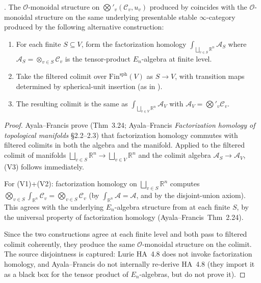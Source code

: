\begin{theorem}
\label{v4-arith:tate:thm:verification-via-factorization-homology}
\ClaimStatusProvedHere. The \(\mathcal{O}\)-monoidal structure on
\(\bigotimes'_{v}(\mathcal{C}_{v},u_{v})\) produced by
 coincides with the
\(\mathcal{O}\)-monoidal structure on the same underlying
presentable stable \(\infty\)-category produced by the following
alternative construction:
\begin{enumerate}
\item[(V1)] For each finite \(S\subseteq V\), form the factorization
homology
\(\int_{\bigsqcup_{v\in S}\mathbb{R}^{n}}\mathcal{A}_{S}\)
where \(\mathcal{A}_{S}=\otimes_{v\in S}\mathcal{C}_{v}\) is the
tensor-product \(E_{n}\)-algebra at finite level.
\item[(V2)] Take the filtered colimit over
\(\mathrm{Fin}^{\mathrm{sph}}(V)\) as \(S\to V\), with transition maps
determined by spherical-unit insertion (as in
).
\item[(V3)] The resulting colimit is the same as
\(\int_{\bigsqcup_{v\in V}\mathbb{R}^{n}}\mathcal{A}_{V}\) with
\(\mathcal{A}_{V}=\bigotimes'_{v}\mathcal{C}_{v}\).
\end{enumerate}
\end{theorem}

\begin{proof}
Ayala--Francis prove (Thm~3.24; Ayala--Francis
\emph{Factorization homology of topological manifolds}
\S2.2--2.3) that factorization homology commutes with filtered
colimits in both the algebra and the manifold. Applied to the
filtered colimit of manifolds \(\bigsqcup_{v\in S}\mathbb{R}^{n}\to\bigsqcup_{v\in V}\mathbb{R}^{n}\)
and the colimit algebra \(\mathcal{A}_{S}\to\mathcal{A}_{V}\),
(V3) follows immediately.

For (V1)+(V2): factorization homology on
\(\bigsqcup_{v\in S}\mathbb{R}^{n}\) computes
\(\bigotimes_{v\in S}\int_{\mathbb{R}^{n}}\mathcal{C}_{v}=\bigotimes_{v\in S}\mathcal{C}_{v}\)
(by \(\int_{\mathbb{R}^{n}}\mathcal{A}=\mathcal{A}\), and by the
disjoint-union axiom). This agrees with the underlying
\(E_{n}\)-algebra structure from 
at each finite \(S\), by the universal property of factorization
homology (Ayala--Francis~Thm~2.24).

Since the two constructions agree at each finite level and both
pass to filtered colimit coherently, they produce the same
\(\mathcal{O}\)-monoidal structure on the colimit. The source
disjointness is captured: Lurie HA~4.8 does not invoke
factorization homology, and Ayala--Francis do not internally
re-derive HA~4.8 (they import it as a black box for the tensor
product of \(E_{n}\)-algebras, but do not prove it).
\end{proof}


